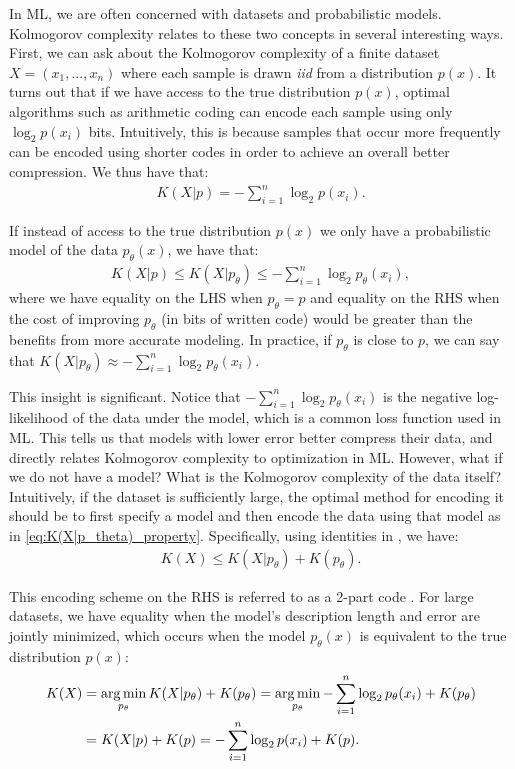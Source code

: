 \documentclass{article} %
\begin{document}
\begin{appendices}
In ML, we are often concerned with datasets and probabilistic models. Kolmogorov complexity relates to these two concepts in several interesting ways. First, we can ask about the Kolmogorov complexity of a finite dataset $X = (x_1, ..., x_n)$ where each sample is drawn \textit{iid} from a distribution $p(x)$. It turns out that if we have access to the true distribution $p(x)$, optimal algorithms such as arithmetic coding \citep{witten1987arithmetic} can encode each sample using only $\log_2p(x_i)$ bits. Intuitively, this is because samples that occur more frequently can be encoded using shorter codes in order to achieve an overall better compression. We thus have that:
\begin{align}
\label{eq:K(X|p)_property}
K(X|p) = -\sum_{i=1}^n \log_2p(x_i) .
\end{align}

If instead of access to the true distribution $p(x)$ we only have a probabilistic model of the data $p_\theta(x)$, we have that:
\begin{align}
\label{eq:K(X|p_theta)_property}
K(X|p) \leq K(X|p_\theta) \leq -\sum_{i=1}^n \log_2p_\theta(x_i) ,
\end{align}
where we have equality on the LHS when $p_\theta = p$ and equality on the RHS when the cost of improving $p_\theta$ (in bits of written code) would be greater than the benefits from more accurate modeling. In practice, if $p_\theta$ is close to $p$, we can say that $K(X|p_\theta) \approx -\sum_{i=1}^n \log_2p_\theta(x_i)$.

This insight is significant. Notice that $-\sum_{i=1}^n \log_2p_\theta(x_i)$ is the negative log-likelihood of the data under the model, which is a common loss function used in ML. This tells us that models with lower error better compress their data, and directly relates Kolmogorov complexity to optimization in ML. However, what if we do not have a model? What is the Kolmogorov complexity of the data itself? Intuitively, if the dataset is sufficiently large, the optimal method for encoding it should be to first specify a model and then encode the data using that model as in \cref{eq:K(X|p_theta)_property}. Specifically, using identities in \citet{fortnow2000kolmogorov}, we have:
\begin{align}
\label{eq:K(X)_property}
K(X) \leq K(X|p_\theta) + K(p_\theta) .
\end{align}

This encoding scheme on the RHS is referred to as a 2-part code \citep{grunwald2007minimum}. For large datasets, we have equality when the model's description length and error are jointly minimized, which occurs when the model $p_\theta(x)$ is equivalent to the true distribution $p(x)$:
\begin{align}
\label{eq:K(X)_argmin_property_1}
K(X) &= \operatorname*{arg\,min}_{p_\theta} K(X|p_\theta) + K(p_\theta) =  \operatorname*{arg\,min}_{p_\theta} -\sum_{i=1}^n \log_2p_\theta(x_i) + K(p_\theta) \\
\label{eq:K(X)_argmin_property_2}
     &= K(X|p) + K(p) = -\sum_{i=1}^n \log_2p(x_i) + K(p) .
\end{align}


\end{appendices}
\end{document}
